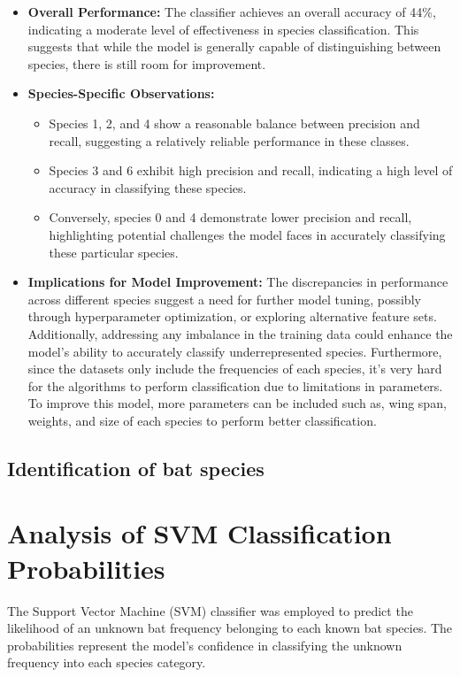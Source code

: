 \documentclass[12pt]{article}
\begin{document}
\begin{itemize}
    \item \textbf{Overall Performance:} The classifier achieves an overall accuracy of 44\%, indicating a moderate level of effectiveness in species classification. This suggests that while the model is generally capable of distinguishing between species, there is still room for improvement.

    \item \textbf{Species-Specific Observations:}
    \begin{itemize}
        \item Species 1, 2, and 4 show a reasonable balance between precision and recall, suggesting a relatively reliable performance in these classes.
        \item Species 3 and 6 exhibit high precision and recall, indicating a high level of accuracy in classifying these species.
        \item Conversely, species 0 and 4 demonstrate lower precision and recall, highlighting potential challenges the model faces in accurately classifying these particular species.
    \end{itemize}
    \item \textbf{Implications for Model Improvement:} The discrepancies in performance across different species suggest a need for further model tuning, possibly through hyperparameter optimization, or exploring alternative feature sets. Additionally, addressing any imbalance in the training data could enhance the model's ability to accurately classify underrepresented species. Furthermore, since the datasets only include the frequencies of each species, it's very hard for the algorithms to perform classification due to limitations in parameters. To improve this model, more parameters can be included such as, wing span, weights, and size of each species to perform better classification.
\end{itemize}


\subsection*{Identification of bat species}
\section{Analysis of SVM Classification Probabilities}

The Support Vector Machine (SVM) classifier was employed to predict the likelihood of an unknown bat frequency belonging to each known bat species. The probabilities represent the model's confidence in classifying the unknown frequency into each species category.
\end{document}
